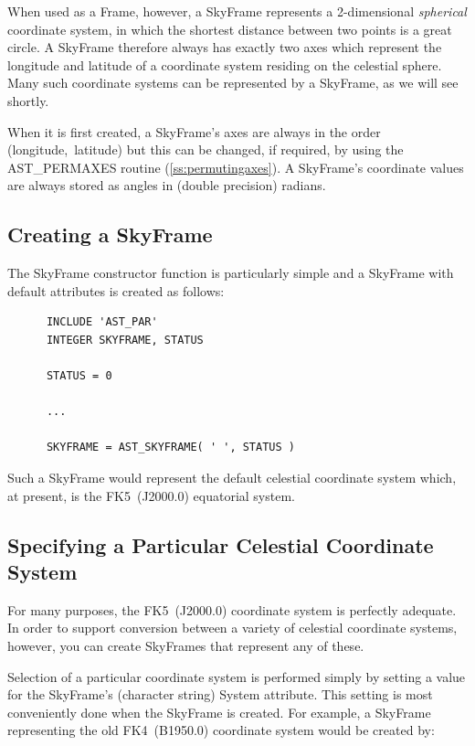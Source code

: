 \documentclass[twoside,11pt]{article}
\newcommand{\htmlref}[2]{#1}
\newcommand{\secref}[1]{\S\ref{#1}}
\renewcommand{\secref}[1]{\ref{#1}}
\begin{document}
When used as a Frame, however, a SkyFrame represents a 2-dimensional
{\em{spherical}} coordinate system, in which the shortest distance
between two points is a great circle.  A SkyFrame therefore always has
exactly two axes which represent the longitude and latitude of a
coordinate system residing on the celestial sphere. Many such
coordinate systems can be represented by a SkyFrame, as we will see
shortly.

When it is first created, a SkyFrame's axes are always in the order
(longitude,~latitude) but this can be changed, if required, by using
the \htmlref{AST\_PERMAXES}{AST_PERMAXES} routine (\secref{ss:permutingaxes}). A SkyFrame's
coordinate values are always stored as angles in (double precision)
radians.

\subsection{Creating a SkyFrame}

The \htmlref{SkyFrame}{SkyFrame} constructor function is particularly simple and a
SkyFrame with default attributes is created as follows:

\small
\begin{verbatim}
      INCLUDE 'AST_PAR'
      INTEGER SKYFRAME, STATUS

      STATUS = 0

      ...

      SKYFRAME = AST_SKYFRAME( ' ', STATUS )
\end{verbatim}
\normalsize

Such a SkyFrame would represent the default celestial coordinate
system which, at present, is the FK5~(J2000.0) equatorial system.

\subsection{Specifying a Particular Celestial Coordinate System}

For many purposes, the FK5~(J2000.0) coordinate system is perfectly
adequate. In order to support conversion between a variety of
celestial coordinate systems, however, you can create SkyFrames that
represent any of these.

Selection of a particular coordinate system is performed simply by
setting a value for the \htmlref{SkyFrame}{SkyFrame}'s (character string) \htmlref{System}{System}
attribute. This setting is most conveniently done when the SkyFrame is
created. For example, a SkyFrame representing the old FK4~(B1950.0)
coordinate system would be created by:
\end{document}
